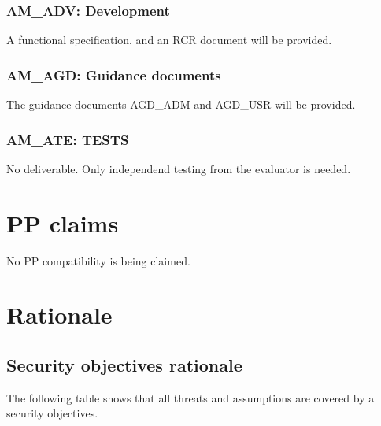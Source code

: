 \documentclass[12pt,english]{scrbook}
\begin{document}
\subsection{AM{\_}ADV: Development}

A functional specification, and an RCR document will be provided.




\subsection{AM{\_}AGD: Guidance documents}

The guidance documents AGD{\_}ADM and AGD{\_}USR will be provided.





\subsection{AM{\_}ATE: TESTS}

No deliverable. Only independend testing from the evaluator is needed.





\chapter{PP claims}

No PP compatibility is being claimed.




\chapter{Rationale}





\section{Security objectives rationale}

The following table shows that all threats and assumptions are covered
by a security objectives. 
\end{document}
